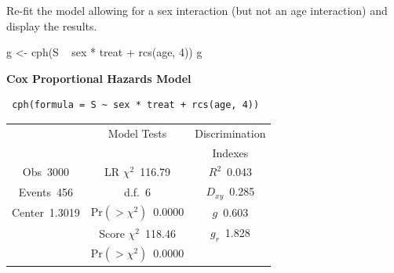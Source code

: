 Re-fit the model allowing for a sex interaction (but not an age interaction) and display the results.
\begin{Sinput}
g <- cph(S ~ sex * treat + rcs(age, 4))
g
\end{Sinput}

 \centerline{\textbf{Cox Proportional Hazards Model}}
 
 \begin{verbatim}
 cph(formula = S ~ sex * treat + rcs(age, 4))
 \end{verbatim}
 
 {\selectfont \begin{center}\begin{tabular}{|c|c|c|}\hline
&Model Tests&Discrimination\\
&&Indexes\\\hline
Obs~\hfill 3000&LR $\chi^{2}$~\hfill 116.79&$R^{2}$~\hfill 0.043\\
Events~\hfill 456&d.f.~\hfill 6&$D_{xy}$~\hfill 0.285\\
Center~\hfill 1.3019&Pr$(>\chi^{2})$~\hfill 0.0000&$g$~\hfill 0.603\\
&Score $\chi^{2}$~\hfill 118.46&$g_{r}$~\hfill 1.828\\
&Pr$(>\chi^{2})$~\hfill 0.0000&\\
\hline
\end{tabular}
\end{center}}
 
